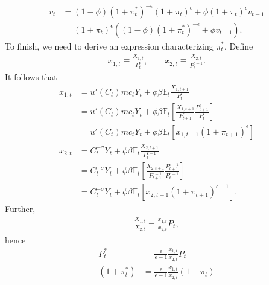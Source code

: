 \documentclass[12 pt, oneside]{article}
\theoremstyle{definition}
\theoremstyle{definition}
\theoremstyle{definition}
\newcommand{\E}{\mathbb{E}}
\begin{document}
\begin{align*}
  v_t & = (1 - \phi) ( 1  + \pi_t^*)^{-\epsilon} ( 1 + \pi_t)^{\epsilon}  +\phi(1 + \pi_t)^{\epsilon}  v_{t - 1}\\
      & = ( 1 + \pi_t)^{\epsilon}((1 - \phi) ( 1  + \pi_t^*)^{-\epsilon}   +\phi  v_{t - 1}).
\end{align*}
To finish, we need to derive an expression characterizing $\pi_t^*$. Define
\begin{align*}
  x_{1, t} \equiv \frac{X_{1, t}}{P_t^\epsilon},\quad\quad x_{2, t} \equiv \frac{X_{2, t}}{P_t^{\epsilon - 1}}.
\end{align*}
It follows that
\begin{align*}
  x_{1, t} & = u'(C_t)mc_t Y_t + \phi \beta \E_t \frac{X_{1, t + 1}}{P_t^\epsilon}\\
           & = u'(C_t)mc_t Y_t + \phi \beta \E_t\left[ \frac{X_{1, t + 1}}{P_{t + 1}^\epsilon}\frac{P_{t + 1}^\epsilon}{P_t^\epsilon}\right]\\
           & = u'(C_t)mc_t Y_t + \phi \beta \E_t[x_{1, t + 1}(1 + \pi_{t + 1})^\epsilon]\\
  x_{2, t} & = C_t^{-\sigma} Y_t + \phi \beta \E_t\frac{X_{2, t + 1}}{P_t^{\epsilon - 1}}\\
           & = C_t^{-\sigma} Y_t + \phi \beta \E_t\left[\frac{X_{2, t + 1}}{P_{t + 1}^{\epsilon - 1}}\frac{P_{t + 1}^{\epsilon - 1}}{P_t^{\epsilon - 1}}\right]\\
           & = C_t^{-\sigma} Y_t + \phi \beta \E_t[x_{2, t + 1}(1 + \pi_{t + 1})^{\epsilon - 1}].
\end{align*}
Further,
\begin{align*}
  \frac{X_{1, t}}{X_{2, t}} = \frac{x_{1, t}}{x_{2, t}}P_t,
\end{align*}
hence
\begin{align*}
  P_t^* & = \frac{\epsilon}{\epsilon - 1}\frac{x_{1, t}}{x_{2, t}}P_t\\
  (1 + \pi_t^*) & = \frac{\epsilon}{\epsilon - 1}\frac{x_{1, t}}{x_{2, t}}(1 + \pi_t)\\
\end{align*}
\end{document}
